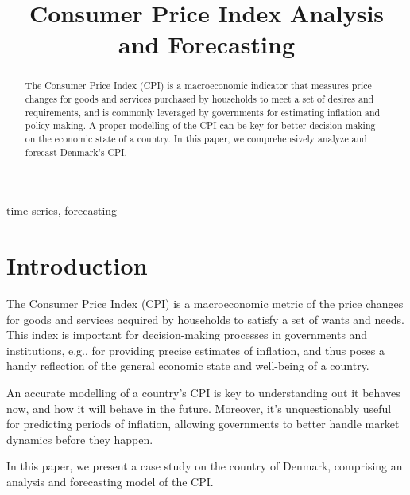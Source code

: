 \documentclass[conference]{IEEEtran}
\begin{document}
\title{Consumer Price Index Analysis and Forecasting}

\author{
\and
{}
}

\maketitle

\begin{abstract}
The Consumer Price Index (CPI) is a macroeconomic indicator that measures price changes for goods and services purchased by households to meet a set of desires and requirements, and is commonly leveraged by governments for estimating inflation and policy-making. A proper modelling of the CPI can be key for better decision-making on the economic state of a country. In this paper, we comprehensively analyze and forecast Denmark's CPI. 
\end{abstract}

\begin{IEEEkeywords}
time series, forecasting
\end{IEEEkeywords}

\section{Introduction}
The Consumer Price Index (CPI) is a macroeconomic metric of the price changes for goods and services acquired by households to satisfy a set of wants and needs. This index is important for decision-making processes in governments and institutions, e.g., for providing precise estimates of inflation, and thus poses a handy reflection of the general economic state and well-being of a country.

An accurate modelling of a country's CPI is key to understanding out it behaves now, and how it will behave in the future. Moreover, it's unquestionably useful for predicting periods of inflation, allowing governments to better handle market dynamics before they happen.

In this paper, we present a case study on the country of Denmark, comprising an analysis and forecasting model of the CPI.
\end{document}

